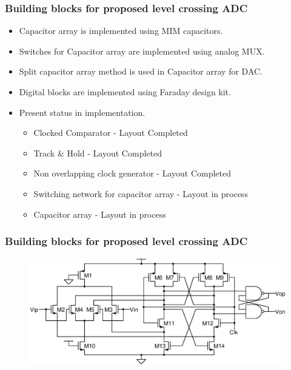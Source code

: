 \documentclass{beamer}
\begin{document}
\begin{frame}
	\frametitle{Building blocks for proposed level crossing ADC} \footnotesize
	\begin{itemize}  
		\item{ Capacitor array is implemented using MIM capacitors. } \\
		\item{ Switches for Capacitor array are implemented using analog MUX. } \\
		\item{ Split capacitor array method is used in Capacitor array for DAC. } \\
		\item{ Digital blocks are implemented using Faraday design kit. } \\
		\item{ Present status in implementation. } \\
			\begin{itemize} \scriptsize
				\item{ Clocked Comparator - Layout Completed} \\
				\item{ Track \& Hold - Layout Completed} \\
				\item{ Non overlapping clock generator - Layout Completed} \\
				\item{ Switching network for capacitor array - Layout in process} \\
				\item{ Capacitor array - Layout in process } \\
			\end{itemize}
	\end{itemize}
\end{frame}
\begin{frame}
	\frametitle{Building blocks for proposed level crossing ADC} \footnotesize
	\begin{center}
		\begin{figure}
			\includegraphics[width=10 cm]{Figures/CMP.eps}\\
		\end{figure}
		\scriptsize{ \color{blue}{Clocked Comparator used in proposed ADC architecture}}
	\end{center}
\end{frame}
\end{document}
